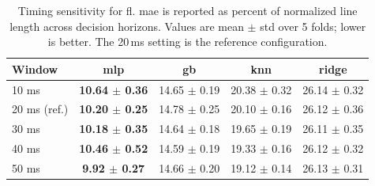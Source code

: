 \begin{table}[ht]
\caption{Timing sensitivity for \ac{fl}. \ac{mae} is reported as percent of normalized line length across decision horizons. Values are mean $\pm$ std over 5 folds; lower is better. The 20\,ms setting is the reference configuration.}
\small
\label{tab:fl_timing_sensitivity}
\centering
\begin{tabular}{lcccc}
\toprule
\bfseries Window & \bfseries \ac{mlp} & \bfseries \ac{gb} & \bfseries \ac{knn} & \bfseries \ac{ridge} \\
\midrule
10 ms & \textbf{10.64 $\pm$ 0.36} & 14.65 $\pm$ 0.19 & 20.38 $\pm$ 0.32 & 26.14 $\pm$ 0.32 \\
20 ms (ref.) & \textbf{10.20 $\pm$ 0.25} & 14.78 $\pm$ 0.25 & 20.10 $\pm$ 0.16 & 26.12 $\pm$ 0.36 \\
30 ms & \textbf{10.18 $\pm$ 0.35} & 14.64 $\pm$ 0.18 & 19.65 $\pm$ 0.19 & 26.11 $\pm$ 0.35 \\
40 ms & \textbf{10.46 $\pm$ 0.52} & 14.59 $\pm$ 0.19 & 19.33 $\pm$ 0.16 & 26.12 $\pm$ 0.32 \\
50 ms & \textbf{9.92 $\pm$ 0.27} & 14.66 $\pm$ 0.20 & 19.12 $\pm$ 0.14 & 26.13 $\pm$ 0.31 \\
\bottomrule
\end{tabular}
\end{table}
